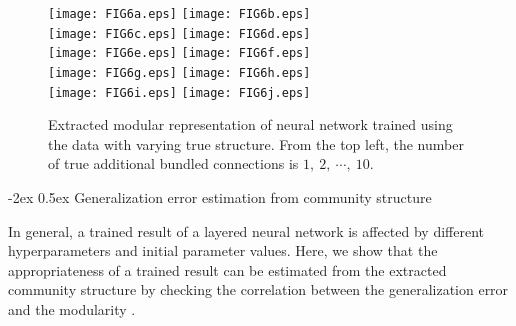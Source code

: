 \documentclass[12pt]{article} %
\makeatletter
\renewcommand\subsection{\@startsection {subsection}{1}%
{\z@}%
{-2ex}%
{0.5ex}%
{\normalfont\normalsize\itshape}}
\makeatother
\begin{document}
\begin{figure*}
  \centering
  \texttt{[image: FIG6a.eps]}\hspace{3mm}
  \texttt{[image: FIG6b.eps]}\vspace{1mm} \\
  \texttt{[image: FIG6c.eps]}\hspace{3mm}
  \texttt{[image: FIG6d.eps]}\vspace{1mm} \\
  \texttt{[image: FIG6e.eps]}\hspace{3mm}
  \texttt{[image: FIG6f.eps]}\vspace{1mm} \\
  \texttt{[image: FIG6g.eps]}\hspace{3mm}
  \texttt{[image: FIG6h.eps]}\vspace{1mm} \\
  \texttt{[image: FIG6i.eps]}\hspace{3mm}
  \texttt{[image: FIG6j.eps]}\vspace{-3mm}
  \caption{Extracted modular representation of neural network trained using the data with varying true structure. From the top left, the number of true additional bundled connections is $1,\ 2,\ \cdots,\ 10$.}
  \label{fig:exp1bc}
\end{figure*}

\subsection{Generalization error estimation from community structure} %
\label{sec:gee}

In general, a trained result of a layered neural network is affected by different hyperparameters and initial parameter values. Here, we show that the appropriateness of a trained result can be estimated from the extracted community structure by checking the correlation between the generalization error and the modularity \cite{Newman2004}.
\end{document}
